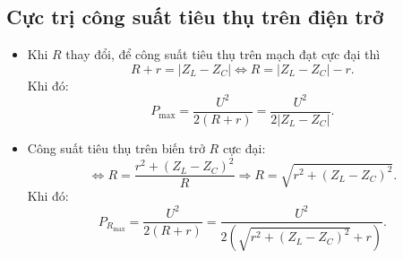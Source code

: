\subsection{Cực trị công suất tiêu thụ trên điện trở}
\begin{itemize}
	\item  Khi $R$ thay đổi, để công suất tiêu thụ trên mạch đạt cực đại thì
	\begin{equation*}
		R + r = |Z_L-Z_C| \Leftrightarrow R=|Z_L-Z_C| - r.
	\end{equation*}
	Khi đó:
	\begin{equation*}
		P_{\text{max}}=\dfrac{U^2}{2(R+r)}=\dfrac{U^2}{2|Z_L-Z_C|}.
	\end{equation*}
	\item Công suất tiêu thụ trên biến trở $R$ cực đại:
	\begin{equation*}
		\Leftrightarrow R = \dfrac{r^2 +(Z_L-Z_C)^2}{R} \Rightarrow R=\sqrt {r^2 + (Z_L-Z_C)^2}.
	\end{equation*}
	Khi đó:
	\begin{equation*}
		P_{R_\text{max}}=\dfrac{U^2}{2(R+r)}=\dfrac{U^2}{2\left(\sqrt {r^2+(Z_L-Z_C)^2}+r\right)}.
	\end{equation*}
\end{itemize}
